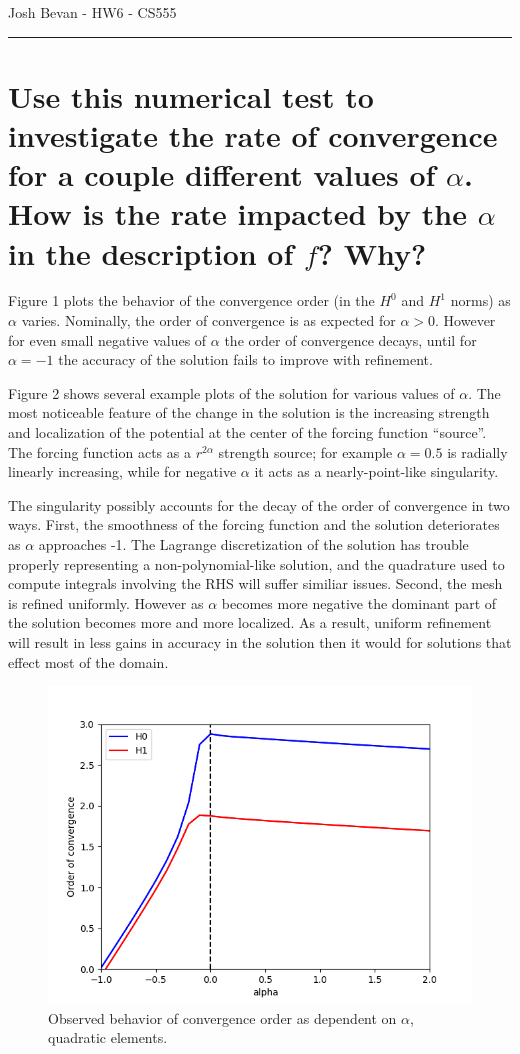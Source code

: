 \documentclass[letterpaper,10pt]{article}
\begin{document}
\begin{flushright}
{\Large Josh Bevan - HW6 - CS555}
\end{flushright}
\vskip -0.1in
\hrule
\vskip 0.4in

\section*{Use this numerical test to investigate the rate of convergence for a couple different values of $\alpha$. How is the rate impacted by the $\alpha$ in the description of $f$? Why?}
Figure 1 plots the behavior of the convergence order (in the $H^0$ and $H^1$ norms) as $\alpha$ varies. Nominally, the order of convergence is as expected for $\alpha > 0$. However for even small negative values of $\alpha$ the order of convergence decays, until for $\alpha=-1$ the accuracy of the solution fails to improve with refinement.

Figure 2 shows several example plots of the solution for various values of $\alpha$. The most noticeable feature of the change in the solution is the increasing strength and localization of the potential at the center of the forcing function ``source''. The forcing function acts as a $r^{2 \alpha}$ strength source; for example $\alpha=0.5$ is radially linearly increasing, while for negative $\alpha$ it acts as a nearly-point-like singularity.

The singularity possibly accounts for the decay of the order of convergence in two ways. First, the smoothness of the forcing function and the solution deteriorates as $\alpha$ approaches -1. The Lagrange discretization of the solution has trouble properly representing a non-polynomial-like solution, and the quadrature used to compute integrals involving the RHS will suffer similiar issues. Second, the mesh is refined uniformly. However as $\alpha$ becomes more negative the dominant part of the solution becomes more and more localized. As a result, uniform refinement will result in  less gains in accuracy in the solution then it would for solutions that effect most of the domain.

\begin{figure}[!htb]
\centering
\includegraphics[width=5in]{conv.PNG}
\caption{Observed behavior of convergence order as dependent on $\alpha$, quadratic elements.}
\end{figure}
\end{document}
